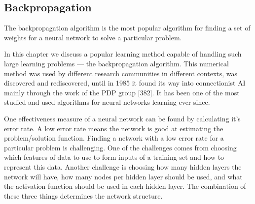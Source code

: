 \subsection{Backpropagation}

The backpropagation algorithm is the most popular algorithm for
finding a set of weights for a neural network to solve a particular
problem.



In this chapter we discuss a popular learning method capable of handling such large learning problems — the backpropagation algorithm. This numerical method was used by different research communities in different contexts, was discovered and rediscovered, until in 1985 it found its way into connectionist AI mainly through the work of the PDP group [382]. It has been one of the most studied and used algorithms for neural networks learning ever since.





One effectiveness measure of a neural network can be found by calculating it's error rate. A low error rate means the network is good at estimating the problem/solution function. Finding a network with a low error rate for a particular problem is challenging. One of the challenges comes from choosing which features of data to use to form inputs of a training set and how to represent this data. Another challenge is choosing how many hidden layers the network will have, how many nodes per hidden layer should be used, and what the activation function should be used in each hidden layer. The combination of these three things determines the network structure. 




